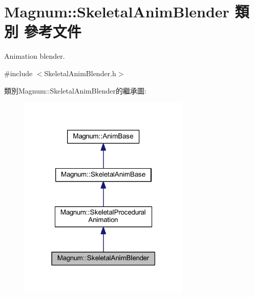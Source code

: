 \hypertarget{class_magnum_1_1_skeletal_anim_blender}{}\section{Magnum\+:\+:Skeletal\+Anim\+Blender 類別 參考文件}
\label{class_magnum_1_1_skeletal_anim_blender}


Animation blender.  




{\ttfamily \#include $<$Skeletal\+Anim\+Blender.\+h$>$}



類別\+Magnum\+:\+:Skeletal\+Anim\+Blender的繼承圖\+:\nopagebreak
\begin{figure}[H]
\begin{center}
\leavevmode
\includegraphics[width=231pt]{class_magnum_1_1_skeletal_anim_blender__inherit__graph}
\end{center}
\end{figure}


